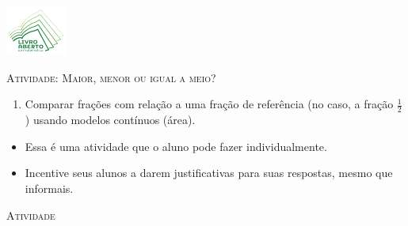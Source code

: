 \documentclass[10 pt,usenames,dvipsnames, oneside]{article}
\begin{document}
\begin{center}
  \begin{minipage}[l]{3cm}
\includegraphics[width=2cm]{logo}    
\end{minipage}\hfill
\begin{minipage}[r]{.8\textwidth}
 {\Large \scshape Atividade: Maior, menor ou igual a meio?}  
\end{minipage}
\end{center}
\vspace{.2cm}

\ifdefined\prof
\begin{goals}
\begin{enumerate}

    \item       Comparar frações com relação a uma fração de referência (no caso, a fração       $\frac{1}{2}$) usando modelos contínuos (área).

\end{enumerate}
\tcblower

  \begin{itemize} %
    \item       Essa é uma atividade que o aluno pode fazer individualmente.
    \item       Incentive seus alunos a darem justificativas para suas respostas, mesmo que informais.
\end{itemize} %

\end{goals}

\bigskip
\begin{center}
{\large \scshape Atividade}
\end{center}
\fi
\end{document}
